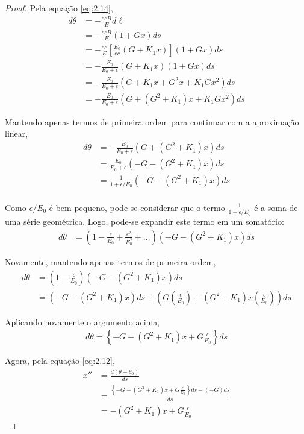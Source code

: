 \begin{proof}
	Pela equação \eqref{eq:2.14},
	\begin{align*}
		d\theta &= -\frac{ecB}{E}d\ell\\
				&= -\frac{ecB}{E}(1+Gx)ds\\
				&= -\frac{ec}{E}\left[\frac{E_0}{ec}(G+K_1x)\right](1+Gx)ds\\
				&= -\frac{E_0}{E_0+\epsilon}(G+K_1x)(1+Gx)ds\\
				&= -\frac{E_0}{E_0+\epsilon}(G+K_1x+G^2x+K_1Gx^2)ds\\
				&= -\frac{E_0}{E_0+\epsilon}(G+(G^2+K_1)x + K_1Gx^2)ds
	\end{align*}
	
	Mantendo apenas termos de primeira ordem para continuar com a aproximação linear,
	\begin{align*}
		d\theta &= -\frac{E_0}{E_0+\epsilon}(G+(G^2+K_1)x)ds\\
				&= \frac{E_0}{E_0+\epsilon}(-G-(G^2+K_1)x)ds\\
				&= \frac{1}{1+\epsilon/E_0}(-G-(G^2+K_1)x)ds\\
	\end{align*}
	
	Como $\epsilon/E_0$ é bem pequeno, pode-se considerar que o termo $\frac{1}{1+\epsilon/E_0}$ é a soma de uma série geométrica. Logo, pode-se expandir este termo em um somatório:
	\begin{align*}
		d\theta &= \left(1 - \frac{\epsilon}{E_0} + \frac{\epsilon^2}{E_0^2}+ ...\right)(-G-(G^2+K_1)x)ds
	\end{align*}
	
	Novamente, mantendo apenas termos de primeira ordem,
	\begin{align*}
		d\theta &= \left(1 - \frac{\epsilon}{E_0}\right)(-G-(G^2+K_1)x)ds\\
				&= (-G-(G^2+K_1)x)ds + \left(G\left(\frac{\epsilon}{E_0}\right)+(G^2+K_1)x\left(\frac{\epsilon}{E_0}\right)\right)ds
	\end{align*}
	
	Aplicando novamente o argumento acima,
	\begin{align*}
		d\theta = \left\{-G-(G^2+K_1)x + G\frac{\epsilon}{E_0}\right\}ds
	\end{align*}
	
	Agora, pela equação \eqref{eq:2.12},
	\begin{align*}
		x'' &= \frac{d(\theta-\theta_0)}{ds}\\
			&= \frac{\left\{-G-(G^2+K_1)x + G\frac{\epsilon}{E_0}\right\}ds - (-G)ds}{ds}\\
			&= -(G^2+K_1)x + G\frac{\epsilon}{E_0}
	\end{align*}
\end{proof}

